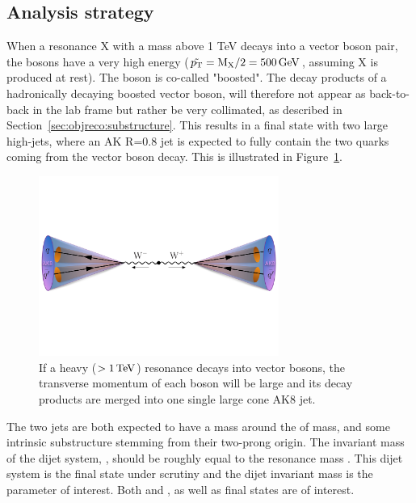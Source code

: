 \subsection{Analysis strategy}

When a resonance X with a mass above 1 TeV decays into a vector boson pair, the bosons have a very high energy ($\tilde{p_{\mathrm{T}}}=\text{M}_{\text{X}}/2=500 \,\text{Ge\hspace{-.08em}V}$, assuming X is produced at rest). The boson is co-called "boosted". The decay products of a hadronically decaying boosted vector boson, will therefore not appear as back-to-back in the lab frame but rather be very collimated, as described in Section~\ref{sec:objreco:substructure}. This results in a final state with two large high-\PT jets, where an AK R=0.8 jet is expected to fully contain the two quarks coming from the vector boson decay. This is illustrated in Figure~\ref{fig:searchI:merged}.

\begin{figure}[ht] 
    \centering
    \includegraphics[width=0.70\textwidth]{figures/event_reconstruction/WWqqqq_merged_small.pdf}
    \caption{If a heavy ($>1 \,\text{Te\hspace{-.08em}V}$) resonance decays into vector bosons, the transverse momentum of each boson will be large and its decay products are merged into one single large cone AK8 jet.}
    \label{fig:searchI:merged}
\end{figure}

The two jets are both expected to have a mass around the \PW of \PZ mass, and some intrinsic substructure stemming from their two-prong origin. The invariant mass of the dijet system, \mjj, should be roughly equal to the resonance mass \mX. This dijet system is the final state under scrutiny and the dijet invariant mass is the parameter of interest. Both \WW and \ZZ, as well as \WZ final states are of interest. \par

